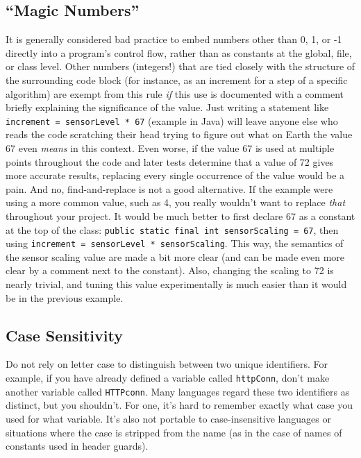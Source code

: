 \documentclass[12pt]{article}
\newcommand{\code}[1]{\texttt{#1}}
\begin{document}
\subsection{``Magic Numbers''}
It is generally considered bad practice to embed numbers other than 0, 1, or -1 directly into a program's control flow, rather than as constants at the global, file, or class level. Other numbers (integers!) that are tied closely with the structure of the surrounding code block (for instance, as an increment for a step of a specific algorithm) are exempt from this rule \emph{if} this use is documented with a comment briefly explaining the significance of the value. Just writing a statement like \code{increment = sensorLevel * 67} (example in Java) will leave anyone else who reads the code scratching their head trying to figure out what on Earth the value 67 even \emph{means} in this context. Even worse, if the value 67 is used at multiple points throughout the code and later tests determine that a value of 72 gives more accurate results, replacing every single occurrence of the value would be a pain. And no, find-and-replace is not a good alternative. If the example were using a more common value, such as 4, you really wouldn't want to replace \emph{that} throughout your project. It would be much better to first declare 67 as a constant at the top of the class: \code{public static final int sensorScaling = 67}, then using \code{increment = sensorLevel * sensorScaling}. This way, the semantics of the sensor scaling value are made a bit more clear (and can be made even more clear by a comment next to the constant). Also, changing the scaling to 72 is nearly trivial, and tuning this value experimentally is much easier than it would be in the previous example.
\subsection{Case Sensitivity}
Do not rely on letter case to distinguish between two unique identifiers. For example, if you have already defined a variable called \code{httpConn}, don't make another variable called \code{HTTPconn}. Many languages regard these two identifiers as distinct, but you shouldn't. For one, it's hard to remember exactly what case you used for what variable. It's also not portable to case-insensitive languages or situations where the case is stripped from the name (as in the case of names of constants used in header guards).
\end{document}
